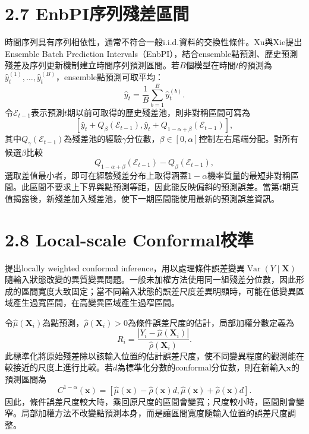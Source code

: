 \section*{2.7 EnbPI序列殘差區間}

時間序列具有序列相依性，通常不符合一般i.i.d.資料的交換性條件。Xu與Xie提出Ensemble Batch Prediction Intervals（EnbPI），結合ensemble點預測、歷史預測殘差及序列更新機制建立時間序列預測區間\cite{xu2023}。若$B$個模型在時間$t$的預測為$\widehat y_t^{(1)},\ldots,\widehat y_t^{(B)}$，ensemble點預測可取平均：
\begin{equation}
 \widehat y_t=\frac{1}{B}\sum_{b=1}^{B}\widehat y_t^{(b)}.
\end{equation}
令$\mathcal E_{t-1}$表示預測$t$期以前可取得的歷史殘差池，則非對稱區間可寫為
\begin{equation}
 \left[
 \widehat y_t+Q_{\beta}(\mathcal E_{t-1}),
 \widehat y_t+Q_{1-\alpha+\beta}(\mathcal E_{t-1})
 \right],
\end{equation}
其中$Q_\gamma(\mathcal E_{t-1})$為殘差池的經驗$\gamma$分位數，$\beta\in[0,\alpha]$控制左右尾端分配。對所有候選$\beta$比較
\begin{equation}
 Q_{1-\alpha+\beta}(\mathcal E_{t-1})
 -Q_{\beta}(\mathcal E_{t-1}),
\end{equation}
選取差值最小者，即可在經驗殘差分布上取得涵蓋$1-\alpha$機率質量的最短非對稱區間。此區間不要求上下界與點預測等距，因此能反映偏斜的預測誤差。當第$t$期真值揭露後，新殘差加入殘差池，使下一期區間能使用最新的預測誤差資訊。

\section*{2.8 Local-scale Conformal校準}

\cite{lei2018}提出locally weighted conformal inference，用以處理條件誤差變異$\operatorname{Var}(Y\mid\boldsymbol X)$隨輸入狀態改變的異質變異問題。一般未加權方法使用同一組殘差分位數，因此形成的區間寬度大致固定；當不同輸入狀態的誤差尺度差異明顯時，可能在低變異區域產生過寬區間，在高變異區域產生過窄區間。

令$\widehat\mu(\boldsymbol X_i)$為點預測，$\widehat\rho(\boldsymbol X_i)>0$為條件誤差尺度的估計，局部加權分數定義為
\begin{equation}
 R_i=\frac{|Y_i-\widehat\mu(\boldsymbol X_i)|}
 {\widehat\rho(\boldsymbol X_i)}.
\end{equation}
此標準化將原始殘差除以該輸入位置的估計誤差尺度，使不同變異程度的觀測能在較接近的尺度上進行比較。若$d$為標準化分數的conformal分位數，則在新輸入$\boldsymbol x$的預測區間為
\begin{equation}
 C^{1-\alpha}(\boldsymbol x)
 =\left[
 \widehat\mu(\boldsymbol x)-\widehat\rho(\boldsymbol x)d,
 \widehat\mu(\boldsymbol x)+\widehat\rho(\boldsymbol x)d
 \right].
\end{equation}
因此，條件誤差尺度較大時，乘回原尺度的區間會變寬；尺度較小時，區間則會變窄。局部加權方法不改變點預測本身，而是讓區間寬度隨輸入位置的誤差尺度調整。

